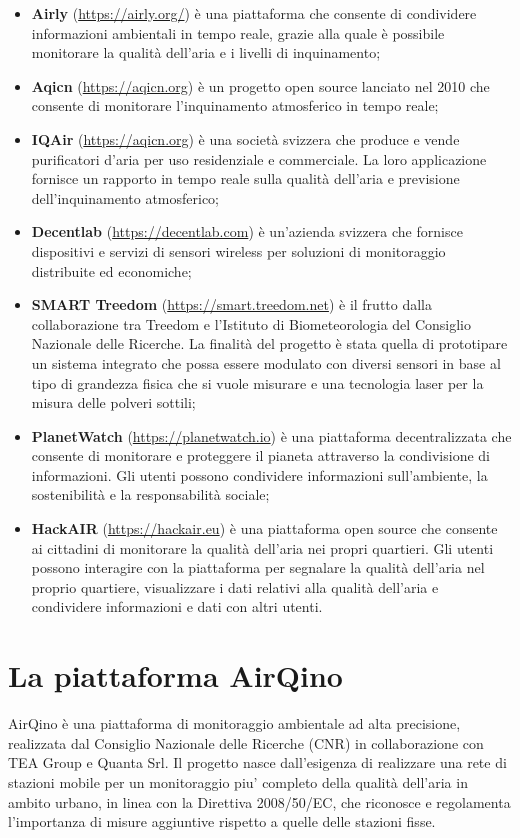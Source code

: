 \begin{itemize}
	\item \textbf{Airly} (\url{https://airly.org/}) è una piattaforma che consente di condividere informazioni ambientali in tempo reale, grazie alla quale è possibile monitorare la qualità dell'aria e i livelli di inquinamento;
	\item \textbf{Aqicn} (\url{https://aqicn.org}) è un progetto open source lanciato nel 2010 che consente di monitorare l'inquinamento atmosferico in tempo reale;
	\item \textbf{IQAir} (\url{https://aqicn.org}) è una società svizzera che produce e vende purificatori d'aria per uso residenziale e commerciale. La loro applicazione fornisce un rapporto in tempo reale sulla qualità dell'aria e previsione dell'inquinamento atmosferico;
	\item \textbf{Decentlab} (\url{https://decentlab.com}) è un'azienda svizzera che fornisce dispositivi e servizi di sensori wireless per soluzioni di monitoraggio distribuite ed economiche;
	\item \textbf{SMART Treedom} (\url{https://smart.treedom.net}) è il frutto dalla collaborazione tra Treedom e l’Istituto di Biometeorologia del Consiglio Nazionale delle Ricerche. La finalità del progetto è stata quella di prototipare un sistema integrato che possa essere modulato con diversi sensori in base al tipo di grandezza fisica che si vuole misurare e una tecnologia laser per la misura delle polveri sottili;
	\item \textbf{PlanetWatch} (\url{https://planetwatch.io}) è una piattaforma decentralizzata che consente di monitorare e proteggere il pianeta attraverso la condivisione di informazioni. Gli utenti possono condividere informazioni sull'ambiente, la sostenibilità e la responsabilità sociale;
	\item \textbf{HackAIR} (\url{https://hackair.eu}) è una piattaforma open source che consente ai cittadini di monitorare la qualità dell'aria nei propri quartieri. Gli utenti possono interagire con la piattaforma per segnalare la qualità dell'aria nel proprio quartiere, visualizzare i dati relativi alla qualità dell'aria e condividere informazioni e dati con altri utenti.
\end{itemize}

\section{La piattaforma AirQino}\label{sec:airqino}
AirQino è una piattaforma di monitoraggio ambientale ad alta precisione, realizzata dal Consiglio Nazionale delle Ricerche (CNR) in collaborazione con TEA Group e Quanta Srl.
Il progetto nasce dall’esigenza di realizzare una rete di stazioni mobile per un monitoraggio piu’ completo della qualità dell’aria in ambito urbano, in linea con la Direttiva 2008/50/EC, che riconosce e regolamenta l’importanza di misure aggiuntive rispetto a quelle delle stazioni fisse.

